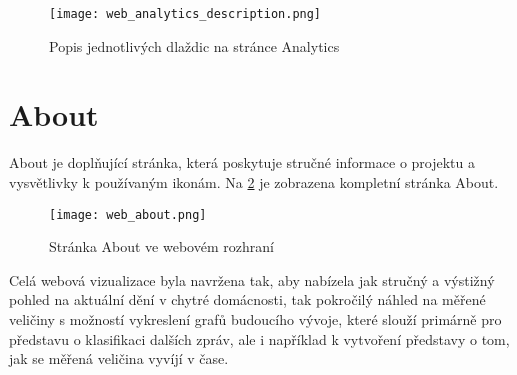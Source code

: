 \begin{figure}[H]
 \centering
  \texttt{[image: web\_analytics\_description.png]}
  \caption{Popis jednotlivých dlaždic na stránce Analytics}
  \label{fig:web_analytics_description}
\end{figure}

\section{About} \label{sec:about}

About je doplňující stránka, která poskytuje stručné informace o projektu a vysvětlivky k používaným ikonám. Na \cref{fig:web_about} je zobrazena kompletní stránka About. 

\begin{figure}[H]
  \centering
  \texttt{[image: web\_about.png]}
  \caption{Stránka About ve webovém rozhraní}
  \label{fig:web_about}
\end{figure}

Celá webová vizualizace byla navržena tak, aby nabízela jak stručný a výstižný pohled na aktuální dění v chytré domácnosti, tak pokročilý náhled na měřené veličiny s možností vykreslení grafů budoucího vývoje, které slouží primárně pro představu o klasifikaci dalších zpráv, ale i například k vytvoření představy o tom, jak se měřená veličina vyvíjí v čase. 